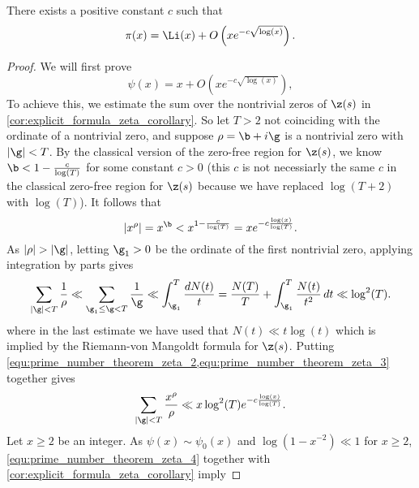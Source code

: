       \begin{theorem}
        There exists a positive cons\-tant $c$ such that
        \[
          \pi(x) = \Li(x)+O\left(xe^{-c\sqrt{\log(x)}}\right).
        \]
      \end{theorem}
      \begin{proof}
        We will first prove
        \begin{equation}\label{equ:prime_number_theorem_zeta_1}
          \psi(x) = x+O\left(xe^{-c\sqrt{\log(x)}}\right),
        \end{equation}
        To achieve this, we estimate the sum over the nontrivial zeros of $\z(s)$ in \cref{cor:explicit_formula_zeta_corollary}. So let $T > 2$ not coinciding with the ordinate of a nontrivial zero, and suppose $\rho = \b+i\g$ is a nontrivial zero with $|\g| < T$. By the classical version of the zero-free region for $\z(s)$, we know $\b < 1-\frac{c}{\log(T)}$ for some constant $c > 0$ (this $c$ is not necessiarly the same $c$ in the classical zero-free region for $\z(s)$ because we have replaced $\log(T+2)$ with $\log(T)$). It follows that
        \begin{equation}\label{equ:prime_number_theorem_zeta_2}
          |x^{\rho}| = x^{\b} < x^{1-\frac{c}{\log(T)}} = xe^{-c\frac{\log(x)}{\log(T)}}.
        \end{equation}
        As $|\rho| > |\g|$, letting $\g_{1} > 0$ be the ordinate of the first nontrivial zero, applying integration by parts gives
        \begin{equation}\label{equ:prime_number_theorem_zeta_3}
          \sum_{|\g| < T}\frac{1}{\rho} \ll \sum_{\g_{1} \le \g < T}\frac{1}{\g} \ll \int_{\g_{1}}^{T}\frac{dN(t)}{t} = \frac{N(T)}{T}+\int_{\g_{1}}^{T}\frac{N(t)}{t^{2}}\,dt \ll \log^{2}(T).
        \end{equation}
        where in the last estimate we have used that $N(t) \ll t\log(t)$ which is implied by the Riemann-von Mangoldt formula for $\z(s)$. Putting \cref{equ:prime_number_theorem_zeta_2,equ:prime_number_theorem_zeta_3} together gives
        \begin{equation}\label{equ:prime_number_theorem_zeta_4}
          \sum_{|\g| < T}\frac{x^{\rho}}{\rho} \ll x\log^{2}(T)e^{-c\frac{\log(x)}{\log(T)}}.
        \end{equation}
        Let $x \ge 2$ be an integer. As $\psi(x) \sim \psi_{0}(x)$ and $\log(1-x^{-2}) \ll 1$ for $x \ge 2$, \cref{equ:prime_number_theorem_zeta_4} together with \cref{cor:explicit_formula_zeta_corollary} imply

\end{proof}
